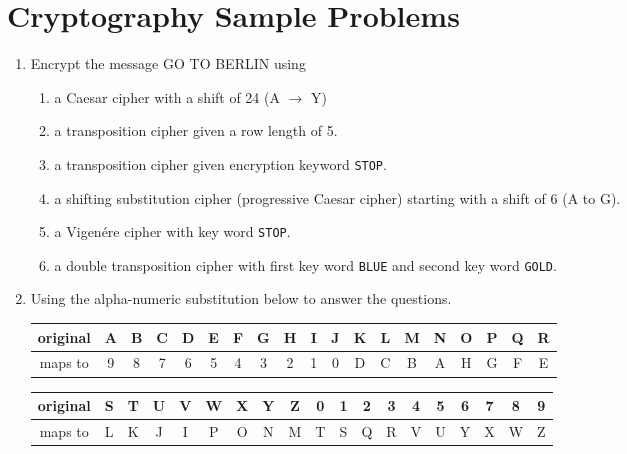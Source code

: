 \documentclass[12pt]{article}
\begin{document}
\section*{Cryptography Sample Problems}
\begin{enumerate}
\item Encrypt the message GO TO BERLIN using
	\begin{enumerate}
	\item a Caesar cipher with a shift of 24 (A $\to$ Y)
	\vspace{1in}
		\item a transposition cipher given a row length of 5.
	\vfill
	\item a transposition cipher given encryption keyword {\tt STOP}.
	\vfill

	\item a shifting substitution cipher (progressive Caesar cipher) starting with a shift of 6 (A to G).
	\vfill
		\newpage
	\item a Vigen\'{e}re cipher with key word {\tt STOP}.
	\vspace{1in}
	\item a double transposition cipher with first key word {\tt BLUE} and second key word {\tt GOLD}.
	\vfill
	\end{enumerate}
\item Using the alpha-numeric substitution below to answer the questions.

{\small
\begin{tabular}{|c|c|c|c|c|c|c|c|c|c|c|c|c|c|c|c|c|c|c|}
\hline
original& A&B&C&D&E&F&G&H&I&J&K&L&M&N&O&P&Q&R\\  \hline
maps to&9&8&7&6&5&4&3&2&1&0&D&C&B&A&H&G&F&E\\
\hline
\end{tabular}

\begin{tabular}{|c|c|c|c|c|c|c|c|c|c|c|c|c|c|c|c|c|c|c|}
 \hline
original &S&T&U&V&W&X&Y&Z&0&1&2&3&4&5&6&7&8&9\\ \hline
maps to&L&K&J&I&P&O&N&M&T&S&Q&R&V&U&Y&X&W&Z \\
\hline
\end{tabular}
}


\end{enumerate}
\end{document}
